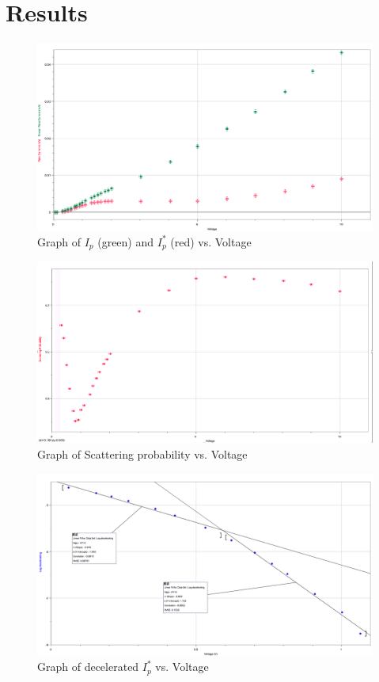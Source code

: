 \documentclass{article}
\begin{document}
\section*{Results}
\begin{figure}[H]
    \centering
    \includegraphics[scale = 0.3]{1.png}
    \caption{Graph of $I_p$ (green) and $I_p^*$ (red) vs. Voltage}
    \label{fig:1}
\end{figure}
\begin{figure}[H]
    \centering
    \includegraphics[scale = 0.3]{2.png}
    \caption{Graph of Scattering probability vs. Voltage}
    \label{fig:2}
\end{figure}
\begin{figure}[H]
    \centering
    \includegraphics[scale = 0.3]{3.png}
    \caption{Graph of decelerated $I_p^*$ vs. Voltage}
    \label{fig:3}
\end{figure}
\end{document}

